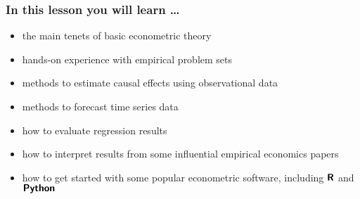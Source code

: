 

\begin{frame}
  \frametitle{In this lesson you will learn \dots}
  \begin{itemize}
  \item the main tenets of basic econometric theory
  \item hands-on experience with empirical problem sets
  \item methods to estimate causal effects using observational data
  \item methods to forecast time series data
  \item how to evaluate regression results 
  \item how to interpret results from some influential empirical economics papers
  \item how to get started with some popular econometric software, including $\textbf{\textsf{R}}$ and $\textbf{\textsf{Python}}$
  \end{itemize}
\end{frame}

